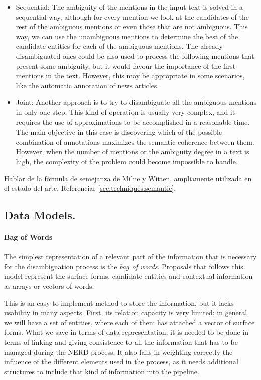 \begin{itemize}
\item Sequential: The ambiguity of the mentions in the input text is solved in a sequential way, although for every mention we look at the candidates of the rest of the ambiguous mentions or even those that are not ambiguous. This way, we can use the unambiguous mentions to determine the best of the candidate entities for each of the ambiguous mentions. The already disambiguated ones could be also used to process the following mentions that present some ambiguity, but it would favour the importance of the first mentions in the text. However, this may be appropriate in some scenarios, like the automatic annotation of news articles.
\item Joint: Another approach is to try to disambiguate all the ambiguous mentions in only one step. This kind of operation is usually very complex, and it requires the use of approximations to be accomplished in a reasonable time. The main objective in this case is discovering which of the possible combination of annotations maximizes the semantic coherence between them. However, when the number of mentions or the ambiguity degree in a text is high, the complexity of the problem could become impossible to handle.
\end{itemize}

{\color{red} Hablar de la fórmula de semejanza de Milne y Witten, ampliamente utilizada en el estado del arte. Referenciar \autoref{sec:techniques:semantic}.}

\subsection{Data Models.}

\paragraph{Bag of Words}

The simplest representation of a relevant part of the information that is necessary for the disambiguation process is the \emph{bag of words}. Proposals that follows this model represent the surface forms, candidate entities and contextual information as arrays or vectors of words.

This is an easy to implement method to store the information, but it lacks usability in many aspects. First, its relation capacity is very limited: in general, we will have a set of entities, where each of them has attached a vector of surface forms. What we save in terms of data representation, it is needed to be done in terms of linking and giving consistence to all the information that has to be managed during the NERD process. It also fails in weighting correctly the influence of the different elements used in the process, as it needs additional structures to include that kind of information into the pipeline.

